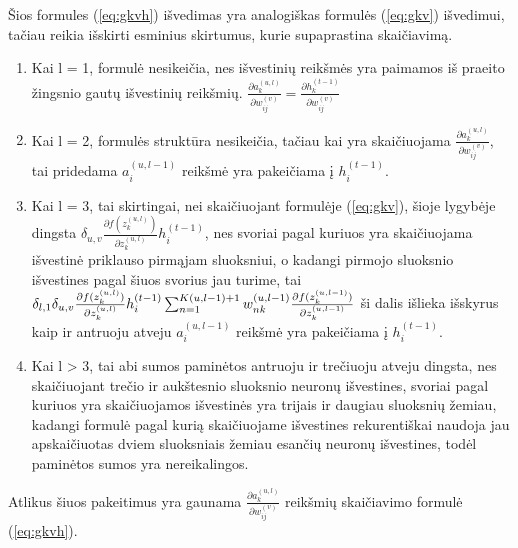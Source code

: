 Šios formules (\ref{eq:gkvh}) išvedimas yra analogiškas formulės (\ref{eq:gkv}) išvedimui, tačiau reikia išskirti esminius skirtumus, kurie supaprastina skaičiavimą.

\begin{enumerate}
  \item Kai l = 1, formulė nesikeičia, nes išvestinių reikšmės yra paimamos iš praeito žingsnio gautų išvestinių reikšmių. $\frac{\partial a_k^{(u, l)}}{\partial w_{ij}^{(v)}} = \frac{\partial h_k^{(t-1)}}{\partial w_{ij}^{(v)}}$
  \item Kai l = 2, formulės struktūra nesikeičia, tačiau kai yra skaičiuojama $\frac{\partial a_k^{(u, l)}}{\partial w_{ij}^{(v)}}$, tai pridedama $a_i^{(u,l-1)}$ reikšmė yra pakeičiama į $h_i^{(t-1)}$.
  \item Kai l = 3, tai skirtingai, nei skaičiuojant formulėje (\ref{eq:gkv}), šioje lygybėje dingsta $\delta_{u,v}\frac{\partial f(z_k^{(u,l)})}{\partial z_k^{(u,l)}}h_i^{(t-1)}$, nes svoriai pagal kuriuos yra skaičiuojama išvestinė priklauso pirmąjam sluoksniui, o kadangi pirmojo sluoksnio išvestines pagal šiuos svorius jau turime, tai $\delta_{l,1}\delta_{u,v}\frac{\partial f(z_k^{(u,l)})}{\partial z_k^{(u,l)}}h_i^{(t-1)}\\ \sum_{n=1}^{K(u,l-1)+1} w_{nk}^{(u,l-1)}\frac{\partial f(z_k^{(u,l-1)})}{\partial z_k^{(u,l-1)}}$ ši dalis išlieka išskyrus kaip ir antruoju atveju $a_i^{(u,l-1)}$ reikšmė yra pakeičiama į $h_i^{(t-1)}$.
  \item Kai l > 3, tai abi sumos paminėtos antruoju ir trečiuoju atveju dingsta, nes skaičiuojant trečio ir aukštesnio sluoksnio neuronų išvestines, svoriai pagal kuriuos yra skaičiuojamos išvestinės yra trijais ir daugiau sluoksnių žemiau, kadangi formulė pagal kurią skaičiuojame išvestines rekurentiškai naudoja jau apskaičiuotas dviem sluoksniais žemiau esančių neuronų išvestines, todėl paminėtos sumos yra nereikalingos.
\end{enumerate}

Atlikus šiuos pakeitimus yra gaunama $\frac{\partial a_k^{(u,l)}}{\partial w_{ij}^{(v)}}$ reikšmių skaičiavimo formulė (\ref{eq:gkvh}).

